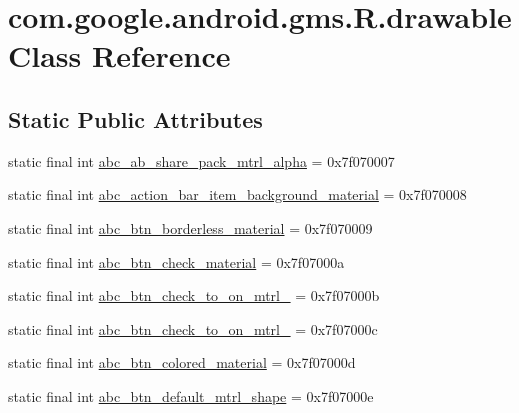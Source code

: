\hypertarget{classcom_1_1google_1_1android_1_1gms_1_1R_1_1drawable}{}\section{com.\+google.\+android.\+gms.\+R.\+drawable Class Reference}
\label{classcom_1_1google_1_1android_1_1gms_1_1R_1_1drawable}
\subsection*{Static Public Attributes}
\begin{DoxyCompactItemize}
\item 
static final int \mbox{\hyperlink{classcom_1_1google_1_1android_1_1gms_1_1R_1_1drawable_a1cf756e70f44091b2a22e3ad796cdd0d}{abc\+\_\+ab\+\_\+share\+\_\+pack\+\_\+mtrl\+\_\+alpha}} = 0x7f070007
\item 
static final int \mbox{\hyperlink{classcom_1_1google_1_1android_1_1gms_1_1R_1_1drawable_a827f3e15e3ef940936f75fdc5b640dcc}{abc\+\_\+action\+\_\+bar\+\_\+item\+\_\+background\+\_\+material}} = 0x7f070008
\item 
static final int \mbox{\hyperlink{classcom_1_1google_1_1android_1_1gms_1_1R_1_1drawable_aac7eea16a97d9c18359b02b7abef7f1b}{abc\+\_\+btn\+\_\+borderless\+\_\+material}} = 0x7f070009
\item 
static final int \mbox{\hyperlink{classcom_1_1google_1_1android_1_1gms_1_1R_1_1drawable_abbb003a106abdb1746cb3d7c28b9e245}{abc\+\_\+btn\+\_\+check\+\_\+material}} = 0x7f07000a
\item 
static final int \mbox{\hyperlink{classcom_1_1google_1_1android_1_1gms_1_1R_1_1drawable_ac69639466e7babcc7f93e365a5541627}{abc\+\_\+btn\+\_\+check\+\_\+to\+\_\+on\+\_\+mtrl\+\_}} = 0x7f07000b
\item 
static final int \mbox{\hyperlink{classcom_1_1google_1_1android_1_1gms_1_1R_1_1drawable_a5e4dea438b7d8242545726097698b387}{abc\+\_\+btn\+\_\+check\+\_\+to\+\_\+on\+\_\+mtrl\+\_}} = 0x7f07000c
\item 
static final int \mbox{\hyperlink{classcom_1_1google_1_1android_1_1gms_1_1R_1_1drawable_af012f3297074741ea173039257ae9a9e}{abc\+\_\+btn\+\_\+colored\+\_\+material}} = 0x7f07000d
\item 
static final int \mbox{\hyperlink{classcom_1_1google_1_1android_1_1gms_1_1R_1_1drawable_a60affcd0daa00f5c6c3448498ea28069}{abc\+\_\+btn\+\_\+default\+\_\+mtrl\+\_\+shape}} = 0x7f07000e

\end{DoxyCompactItemize}
